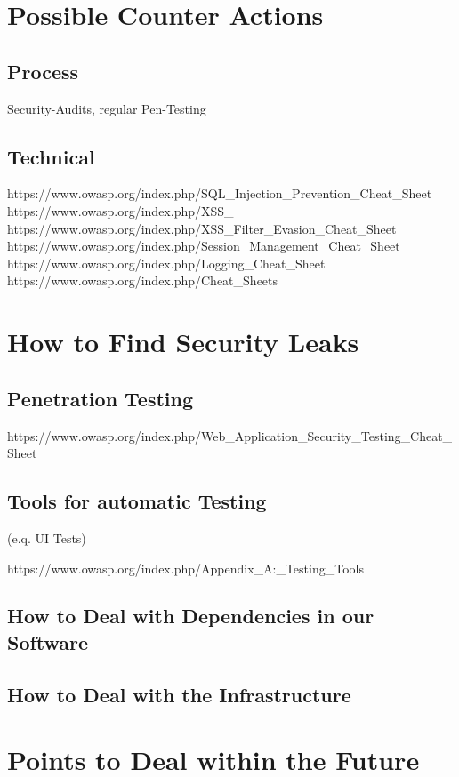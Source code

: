 \section{Possible Counter Actions}

\subsection{Process}
Security-Audits, regular Pen-Testing

\subsection{Technical}
https://www.owasp.org/index.php/SQL_Injection_Prevention_Cheat_Sheet
https://www.owasp.org/index.php/XSS_%
https://www.owasp.org/index.php/XSS_Filter_Evasion_Cheat_Sheet
https://www.owasp.org/index.php/Session_Management_Cheat_Sheet
https://www.owasp.org/index.php/Logging_Cheat_Sheet
https://www.owasp.org/index.php/Cheat_Sheets

\section{How to Find Security Leaks}


\subsection{Penetration Testing}

https://www.owasp.org/index.php/Web_Application_Security_Testing_Cheat_Sheet

\subsection{Tools for automatic Testing}
(e.q. UI Tests)

https://www.owasp.org/index.php/Appendix_A:_Testing_Tools

\subsection{How to Deal with Dependencies in our Software}
\subsection{How to Deal with the Infrastructure}
\section{Points to Deal within the Future}
